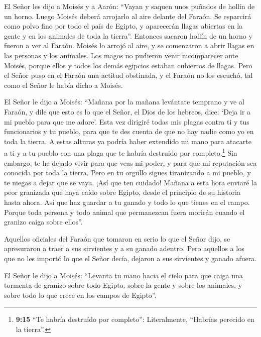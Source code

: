  El Señor les dijo a Moisés y a Aarón: ``Vayan y saquen unos
puñados de hollín de un horno. Luego Moisés deberá arrojarlo al aire
delante del Faraón.  Se esparcirá como polvo fino por todo
el país de Egipto, y aparecerán llagas abiertas en la gente y en los
animales de toda la tierra''.  Entonces sacaron hollín de
un horno y fueron a ver al Faraón. Moisés lo arrojó al aire, y se
comenzaron a abrir llagas en las personas y los animales. 
Los magos no pudieron venir nicomparecer ante Moisés, porque ellos y
todos los demás egipcios estaban cubiertos de llagas.  Pero
el Señor puso en el Faraón una actitud obstinada, y el Faraón no los
escuchó, tal como el Señor le había dicho a Moisés.

 El Señor le dijo a Moisés: ``Mañana por la mañana
levántate temprano y ve al Faraón, y dile que esto es lo que el Señor,
el Dios de los hebreos, dice: `Deja ir a mi pueblo para que me adore'.
 Esta vez dirigiré todas mis plagas contra ti y tus
funcionarios y tu pueblo, para que te des cuenta de que no hay nadie
como yo en toda la tierra.  A estas alturas ya podría haber
extendido mi mano para atacarte a ti y a tu pueblo con una plaga que te
habría destruido por completo.\footnote{\textbf{9:15} ``Te habría
  destruído por completo'': Literalmente, ``Habrías perecido en la
  tierra''.}  Sin embargo, te he dejado vivir para que veas
mi poder, y para que mi reputación sea conocida por toda la tierra.
 Pero en tu orgullo sigues tiranizando a mi pueblo, y te
niegas a dejar que se vaya.  ¡Así que ten cuidado! Mañana a
esta hora enviaré la peor granizada que haya caído sobre Egipto, desde
el principio de su historia hasta ahora.  Así que haz
guardar a tu ganado y todo lo que tienes en el campo. Porque toda
persona y todo animal que permanezcan fuera morirán cuando el granizo
caiga sobre ellos''.

 Aquellos oficiales del Faraón que tomaron en serio lo que
el Señor dijo, se apresuraron a traer a sus sirvientes y a su ganado
adentro.  Pero aquellos a los que no les importó lo que el
Señor decía, dejaron a sus sirvientes y ganado afuera.

 El Señor le dijo a Moisés: ``Levanta tu mano hacia el
cielo para que caiga una tormenta de granizo sobre todo Egipto, sobre la
gente y sobre los animales, y sobre todo lo que crece en los campos de
Egipto''.

